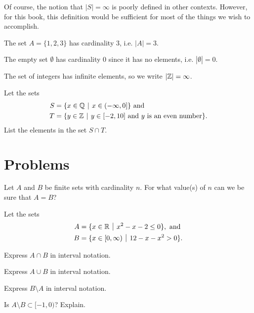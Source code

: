 \begin{remark}
    Of course, the notion that $|S| = \infty$ is poorly defined in other contexts. However, for this book, this definition would be sufficient for most of the things we wish to accomplish.
\end{remark}

\begin{example}
    The set $A = \{1, 2, 3\}$ has cardinality 3, i.e. $|A| = 3$.
\end{example}

\begin{example}
    The empty set $\emptyset$ has cardinality 0 since it has no elements, i.e. $|\emptyset| = 0$.
\end{example}

\begin{example}
    The set of integers has infinite elements, so we write $|\mathbb{Z}| = \infty$.
\end{example}

\begin{exercise}
    Let the sets
    \begin{align*}
        S &= \{x \in \Q \vert x \in (-\infty, 0]\} \text{ and}\\
        T &= \{y \in \Z \vert y \in [-2, 10] \text{ and } y \text{ is an even number} \}.
    \end{align*}
    List the elements in the set $S \cap T$.
\end{exercise}

\newpage

\section{Problems}
\begin{problem}
    Let $A$ and $B$ be finite sets with cardinality $n$. For what value(s) of $n$ can we be sure that $A = B$?
\end{problem}

\begin{problem}
    Let the sets
    \begin{align*}
        A &= \{x \in \R \vert x^2 - x - 2 \leq 0\}, \text{ and}\\
        B &= \{x \in [0, \infty) \vert 12 - x - x^2 > 0\}.
    \end{align*}
    \begin{partquestions}{\alph*}
        \item Express $A \cap B$ in interval notation.
        \item Express $A \cup B$ in interval notation.
        \item Express $B \setminus A$ in interval notation.
        \item Is $A \setminus B \subset [-1, 0)$? Explain.
    \end{partquestions}
\end{problem}

